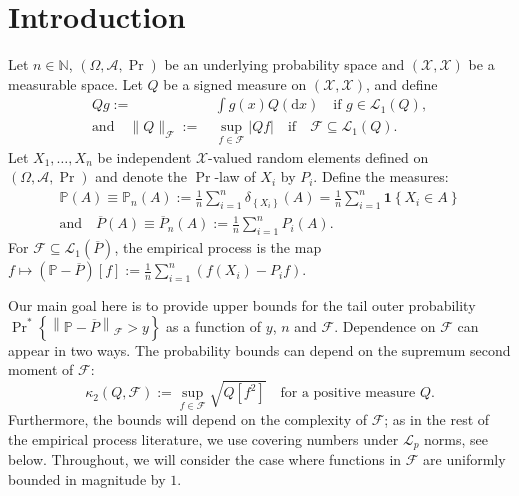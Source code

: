 
\section{Introduction}

Let \(n \in \mathbb{N}\), \((\Omega, \mathscr{A}, \Pr)\) be an underlying
probability space and \((\mathcal{X}, \mathscr{X})\) be a measurable space.
Let \(Q\) be a signed measure on \((\mathcal{X}, \mathscr{X})\),
and define
\begin{equation*}
  \begin{split}
  Q g :=
  & \, \int g (x) Q (\mathrm{d} x) \quad \text{if } g \in \mathscr{L}_{1} (Q),
  \\
  \text{and} \quad \|Q\|_{\mathcal{F}} :=
  & \, \sup_{f \in \mathcal{F}} |Q f| \quad \text{if} \quad \mathcal{F} \subseteq
  \mathscr{L}_{1} (Q).
  \end{split}
\end{equation*}
Let \(X_{1}, \dots, X_{n}\) be independent \(\mathcal{X}\)-valued random
elements defined on \((\Omega, \mathscr{A}, \Pr)\) and denote the \(\Pr\)-law of
\(X_{i}\) by \(P_{i}\).
Define the measures:
\begin{equation*}
  \begin{gathered}
    \mathbb{P} (A) \equiv \mathbb{P}_{n} (A) := \frac{1}{n} \sum_{i = 1}^{n}
    \delta_{\left\{ X_{i} \right\}} (A) = \frac{1}{n} \sum_{i = 1}^{n}
    \mathbf{1} \left\{ X_{i} \in A \right\} \\
    \text{and} \quad \overline{P} (A) \equiv \overline{P}_{n} (A) := \frac{1}{n}
    \sum_{i = 1}^{n} P_{i} (A).
  \end{gathered}
\end{equation*}
For \(\mathcal{F} \subseteq \mathscr{L}_{1} (\overline{P})\),
the empirical process is the map
\(f \mapsto \left( \mathbb{P} - \overline{P} \right) [f] := \frac{1}{n} \sum_{i
= 1}^{n} \left( f \left( X_{i} \right) - P_{i} f \right)\).

Our main goal here is to provide upper bounds for the tail outer probability
\(\Pr^{\ast} \left\{ \left\| \mathbb{P} - \overline{P} \right\|_{\mathcal{F}} >
y \right\}\) as a function of \(y\), \(n\) and \(\mathcal{F}\).
Dependence on \(\mathcal{F}\) can appear in two ways.
The probability bounds can depend on the supremum second moment of
\(\mathcal{F}\):
\begin{equation*}
  \kappa_{2} (Q, \mathcal{F}) := \sup_{f \in \mathcal{F}} \sqrt{Q \left[
  f^{2} \right]} \quad \text{for a positive measure } Q.
\end{equation*}
Furthermore, the bounds will depend on the complexity of \(\mathcal{F}\); as
in the rest of the empirical process literature, we use covering numbers under
\(\mathscr{L}_{p}\) norms, see  below.
Throughout, we will consider the case where functions in \(\mathcal{F}\) are
uniformly bounded in magnitude by \(1\).

